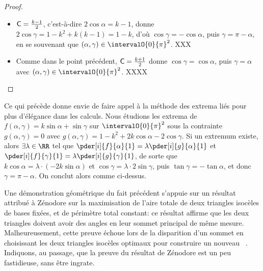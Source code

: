 \begin{proof}
\begin{itemize}
	    \item $\mathsf{C} = \frac{k - 1}{2}$, 
	    c'est-à-dire $2\cos \alpha = k - 1$, 
	    donne 
	    $2 \cos \gamma = 1 - k^2 + k(k - 1) = 1 - k$,
	    d'où
	    $\cos \gamma = - \cos \alpha$, puis $\gamma = \pi - \alpha$, en se souvenant que $(\alpha , \gamma) \in \intervalO{0}{\pi}^2$.
	    XXX


	    \item Comme dans le point précédent,
	    $\mathsf{C} = \frac{k + 1}{2}$
	    donne
	    $\cos \gamma = \cos \alpha$, puis $\gamma = \alpha$ avec $(\alpha , \gamma) \in \intervalO{0}{\pi}^2$.
	    XXXX
	\end{itemize}
	
	\null\vspace{-6ex}
\end{proof}


\begin{remark}
    Ce qui précède donne envie de faire appel à la méthode des extrema liés pour plus d'élégance dans les calculs.
    Nous étudions les extrema de
	$f(\alpha , \gamma) = k \sin \alpha + \sin \gamma$
	sur $\intervalO{0}{\pi}^2$ sous la contrainte
	$g(\alpha , \gamma) = 0$
	avec
	$g(\alpha , \gamma) = 1 - k^2 + 2 k \cos \alpha - 2 \cos \gamma$.
    Si un extremum existe, alors $\exists \lambda \in \RR$ tel que
    $\pder[i]{f}{\alpha}{1} = \lambda \pder[i]{g}{\alpha}{1}$
	et
    $\pder[i]{f}{\gamma}{1} = \lambda \pder[i]{g}{\gamma}{1}$,
	de sorte que
	$k \cos \alpha = \lambda \cdot ( - 2 k \sin \alpha)$
	et
	$\cos \gamma = \lambda \cdot 2 \sin \gamma$,
	puis
	$\tan \gamma = - \tan \alpha$,
	et donc $\gamma = \pi - \alpha$.
	On conclut alors comme ci-dessus.
\end{remark}


\begin{remark}
	Une démonstration géométrique du fait précédent s'appuie sur un résultat attribué à Zénodore sur la maximisation de l'aire totale de deux triangles isocèles de bases fixées, et de périmètre total constant:
	ce résultat affirme que les deux triangles doivent avoir des angles en leur sommet principal de même mesure.
	Malheureusement, cette preuve échoue lors de la disparition d'un sommet en choisissant les deux triangles isocèles optimaux pour construire un nouveau \ngone\ .
	Indiquons, au passage, que la preuve du résultat de Zénodore est un peu fastidieuse, sans être ingrate.
\end{remark}




